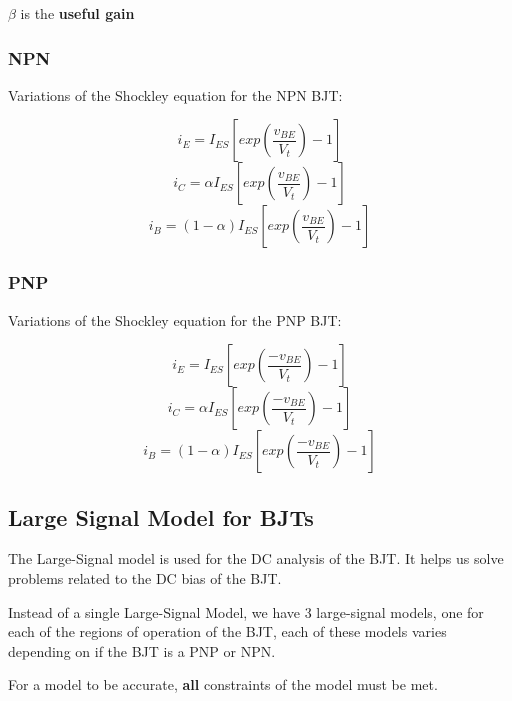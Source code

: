 \documentclass{article}
\begin{document}
\begin{center}
$\beta$ is the \textbf{useful gain}
\end{center}
\subsubsection*{NPN}
\begin{center}
    Variations of the Shockley equation for the NPN BJT:
\end{center}
\begin{equation}
    i_E = I_{ES}[exp (\frac{v_{BE}}{V_t}) -1]
\end{equation}
\begin{equation}
    i_C = \alpha I_{ES}[exp (\frac{v_{BE}}{V_t}) -1]
\end{equation}
\begin{equation}
    i_B = (1 - \alpha)I_{ES}[exp (\frac{v_{BE}}{V_t}) -1]
\end{equation}
\subsubsection*{PNP}
\begin{center}
    Variations of the Shockley equation for the PNP BJT:
\end{center}
\begin{equation}
    i_E = I_{ES}[exp (\frac{-v_{BE}}{V_t}) -1]
\end{equation}
\begin{equation}
    i_C = \alpha I_{ES}[exp (\frac{-v_{BE}}{V_t}) -1]
\end{equation}
\begin{equation}
    i_B = (1 - \alpha)I_{ES}[exp (\frac{-v_{BE}}{V_t}) -1]
\end{equation}
\newpage
\subsection*{Large Signal Model for BJTs}
\begin{center}
    The Large-Signal model is used for the DC analysis of the BJT. It helps us solve problems related to the DC bias of the BJT.
    
    Instead of a single Large-Signal Model, we have 3 large-signal models, one for each of the regions of operation of the BJT, each of these models varies depending on if the BJT is a PNP or NPN.
    
    For a model to be accurate, \textbf{all} constraints of the model must be met.
\end{center}
\end{document}
